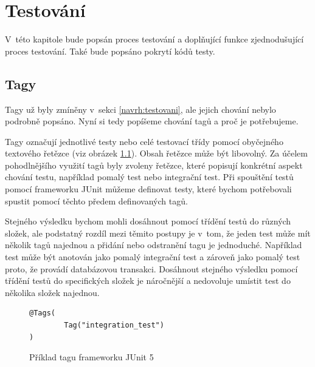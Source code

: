 \chapter{Testování}\label{chapter:testovani}
V~této kapitole bude popsán proces testování a doplňující funkce zjednodušující proces testování. Také bude popsáno pokrytí kódů testy.

\section{Tagy}\label{testovani:tagy}
    Tagy už byly zmíněny v~sekci \ref{navrh:testovani}, ale jejich chování nebylo podrobně popsáno. Nyní si tedy popíšeme chování tagů a proč je potřebujeme. 
    
    Tagy označují jednotlivé testy nebo celé testovací třídy pomocí obyčejného textového řetězce (viz obrázek \ref{code:tag-junit-5}). Obsah řetězce může být libovolný. Za účelem pohodlnějšího využití tagů byly zvoleny řetězce, které popisují konkrétní aspekt chování testu, například pomalý test nebo integrační test. Při spouštění testů pomocí frameworku JUnit můžeme definovat testy, které bychom potřebovali spustit pomocí těchto předem definovaných tagů.
    
    Stejného výsledku bychom mohli dosáhnout pomocí třídění testů do různých složek, ale podstatný rozdíl mezi těmito postupy je v~tom, že jeden test může mít několik tagů najednou a přidání nebo odstranění tagu je jednoduché. Například test může být anotován jako pomalý integrační test a zároveň jako pomalý test proto, že provádí databázovou transakci. Dosáhnout stejného výsledku pomocí třídění testů do specifických složek je náročnější a nedovoluje umístit test do několika složek najednou.
    \begin{figure}
        \begin{verbatim}
@Tags(
        Tag("integration_test")
)
        \end{verbatim}
        \caption{Příklad tagu frameworku JUnit 5} 
        \label{code:tag-junit-5}
    \end{figure}
    
